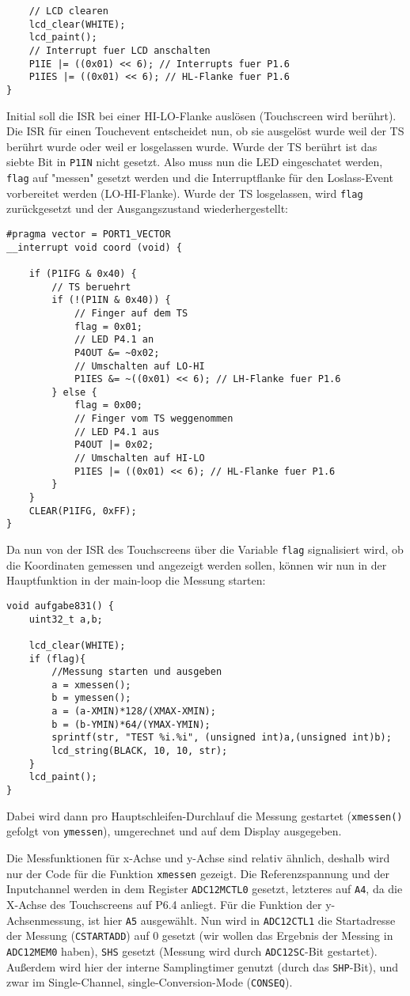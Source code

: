 \documentclass[11pt,a4paper,ngerman]{article}
\begin{document}
\begin{description}
\begin{lstlisting}
	// LCD clearen
	lcd_clear(WHITE);
	lcd_paint();
	// Interrupt fuer LCD anschalten
	P1IE |= ((0x01) << 6); // Interrupts fuer P1.6
	P1IES |= ((0x01) << 6); // HL-Flanke fuer P1.6
}
\end{lstlisting}
\newpage
Initial soll die ISR bei einer HI-LO-Flanke auslösen (Touchscreen wird berührt).
Die ISR für einen Touchevent entscheidet nun, ob sie ausgelöst wurde weil der TS berührt wurde oder weil er losgelassen wurde. Wurde der TS berührt ist das siebte Bit in \texttt{P1IN} nicht gesetzt. Also muss nun die LED eingeschatet werden, \texttt{flag} auf "messen" gesetzt werden und die Interruptflanke für den Loslass-Event vorbereitet werden (LO-HI-Flanke).
Wurde der TS losgelassen, wird \texttt{flag} zurückgesetzt und der Ausgangszustand wiederhergestellt:

\begin{lstlisting}
#pragma vector = PORT1_VECTOR
__interrupt void coord (void) {
	
	if (P1IFG & 0x40) {
		// TS beruehrt
		if (!(P1IN & 0x40)) {
			// Finger auf dem TS
			flag = 0x01;
			// LED P4.1 an
			P4OUT &= ~0x02;
			// Umschalten auf LO-HI
			P1IES &= ~((0x01) << 6); // LH-Flanke fuer P1.6
		} else {
			flag = 0x00;
			// Finger vom TS weggenommen
			// LED P4.1 aus
			P4OUT |= 0x02;
			// Umschalten auf HI-LO
			P1IES |= ((0x01) << 6); // HL-Flanke fuer P1.6
		}
	}	
	CLEAR(P1IFG, 0xFF);	
}
\end{lstlisting}

Da nun von der ISR des Touchscreens über die Variable \texttt{flag} signalisiert wird, ob die Koordinaten gemessen und angezeigt werden sollen, können wir nun in der Hauptfunktion in der main-loop die Messung starten:

\begin{lstlisting}
void aufgabe831() {
	uint32_t a,b;

	lcd_clear(WHITE);
	if (flag){
		//Messung starten und ausgeben
		a = xmessen();	
		b = ymessen();
		a = (a-XMIN)*128/(XMAX-XMIN);
		b = (b-YMIN)*64/(YMAX-YMIN);
		sprintf(str, "TEST %i.%i", (unsigned int)a,(unsigned int)b);
		lcd_string(BLACK, 10, 10, str);
	}
	lcd_paint();
}
\end{lstlisting}
Dabei wird dann pro Hauptschleifen-Durchlauf die Messung gestartet (\texttt{xmessen()} gefolgt von \texttt{ymessen}), umgerechnet und auf dem Display ausgegeben.

\newpage

Die Messfunktionen für x-Achse und y-Achse sind relativ ähnlich, deshalb wird nur der Code für die Funktion \texttt{xmessen} gezeigt. Die Referenzspannung und der Inputchannel werden in dem Register \texttt{ADC12MCTL0} gesetzt, letzteres auf \texttt{A4}, da die X-Achse des Touchscreens auf P6.4 anliegt. Für die Funktion der y-Achsenmessung, ist hier \texttt{A5} ausgewählt.
Nun wird in \texttt{ADC12CTL1} die Startadresse der Messung (\texttt{CSTARTADD}) auf 0 gesetzt (wir wollen das Ergebnis der Messing in \texttt{ADC12MEM0} haben), \texttt{SHS} gesetzt (Messung wird durch \texttt{ADC12SC}-Bit gestartet). Außerdem wird hier der interne Samplingtimer genutzt (durch das \texttt{SHP}-Bit), und zwar im Single-Channel, single-Conversion-Mode (\texttt{CONSEQ}).


\end{description}
\end{document}
